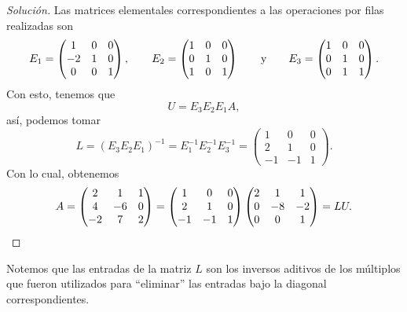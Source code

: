 \documentclass[a4,11pt]{aleph-notas}
\begin{document}
\begin{proof}[Solución]
    Las matrices elementales correspondientes a las operaciones por filas realizadas son
    \[
        E_1 = 
        \begin{pmatrix}
             1 &  0 & 0\\
            -2 &  1 & 0\\
             0 &  0 & 1
        \end{pmatrix},
        \qquad
        E_2 = 
        \begin{pmatrix}
             1 &  0 & 0\\
             0 &  1 & 0\\
             1 &  0 & 1
        \end{pmatrix}
        \qquad\text{y}\qquad
        E_3 = 
        \begin{pmatrix}
             1 &  0 & 0\\
             0 &  1 & 0\\
             0 &  1 & 1
        \end{pmatrix}.
    \]
    Con esto, tenemos que
    \[
        U = E_3E_2E_1 A,
    \]
    así, podemos tomar
    \[
        L = (E_3E_2E_1)^{-1} = E_1^{-1}E_2^{-1}E_3^{-1} = 
        \begin{pmatrix}
             1 &  0 & 0\\
             2 &  1 & 0\\
            -1 & -1 & 1
        \end{pmatrix}.
    \]
    Con lo cual, obtenemos
    \[
        A = 
        \begin{pmatrix}
             2 &  1 & 1\\
             4 & -6 & 0\\
            -2 &  7 & 2
        \end{pmatrix}
        =
        \begin{pmatrix}
             1 &  0 & 0\\
             2 &  1 & 0\\
            -1 & -1 & 1
        \end{pmatrix}
        \begin{pmatrix}
             2 &  1 & 1\\
             0 & -8 & -2\\
             0 &  0 & 1
        \end{pmatrix}
        = LU.\qedhere
    \]
\end{proof}


\begin{advertencia}
    Notemos que las entradas de la matriz $L$ son los inversos aditivos de los múltiplos que fueron utilizados para ``eliminar'' las entradas bajo la diagonal correspondientes.
\end{advertencia}
\end{document}
